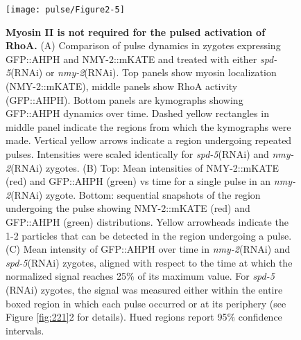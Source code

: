 \begin{figure}[!htbp]
\centering
\texttt{[image: pulse/Figure2-5]}

\caption{\label{fig:225}\textbf{Myosin II is not required for the pulsed activation of RhoA.} (A) Comparison of pulse dynamics in zygotes expressing GFP::AHPH and NMY-2::mKATE and treated with either \textit{spd-5}(RNAi) or \textit{nmy-2}(RNAi). Top panels show myosin localization (NMY-2::mKATE), middle panels show RhoA activity (GFP::AHPH). Bottom panels are kymographs showing GFP::AHPH dynamics over time.  Dashed yellow rectangles in middle panel indicate the regions from which the kymographs were made. Vertical yellow arrows indicate a region undergoing repeated pulses. Intensities were scaled identically for \textit{spd-5}(RNAi) and \textit{nmy-2}(RNAi) zygotes. (B) Top: Mean intensities of NMY-2::mKATE (red) and GFP::AHPH (green) vs time for a single pulse in an \textit{nmy-2}(RNAi) zygote. Bottom: sequential snapshots of the region undergoing the pulse showing NMY-2::mKATE (red) and GFP::AHPH (green) distributions. Yellow arrowheads indicate the  1-2 particles that can be detected in the region undergoing a pulse. (C) Mean intensity of GFP::AHPH over time in \textit{nmy-2}(RNAi) and \textit{spd-5}(RNAi) zygotes, aligned with respect to the time at which the normalized signal reaches 25$\%$ of its maximum value.  For \textit{spd-5} (RNAi) zygotes, the signal was measured either within the entire boxed region in which each pulse occurred  or at its periphery (see Figure \ref{fig:221}2 for details). Hued regions report 95$\%$ confidence intervals.}
\end{figure}



